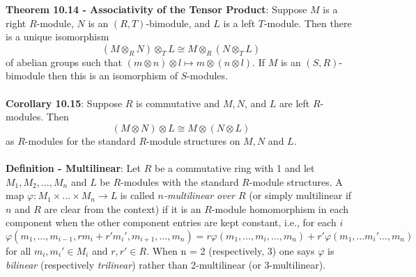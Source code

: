 \documentclass{article}
\begin{document}
\textbf{Theorem 10.14 - Associativity of the Tensor Product}: Suppose $M$ is a right $R$-module, $N$ is an $(R, T)$-bimodule, and $L$ is a left $T$-module. Then there is a unique isomorphism $$(M \otimes_R N) \otimes_T L \cong M \otimes_R (N \otimes_T L)$$ of abelian groups such that $(m \otimes n) \otimes l \mapsto m \otimes (n \otimes l)$. If $M$ is an $(S, R)$-bimodule then this is an isomorphism of $S$-modules. \\ \\
\textbf{Corollary 10.15}: Suppose $R$ is commutative and $M, N$, and $L$ are left $R$-modules. Then $$(M \otimes N) \otimes L \cong M \otimes (N \otimes L)$$ as $R$-modules for the standard $R$-module structures on $M, N$ and $L$. \\ \\
\textbf{Definition - Multilinear}: Let $R$ be a commutative ring with 1 and let $M_1, M_2, \dots, M_n$ and $L$ be
$R$-modules with the standard $R$-module structures. A map $\varphi: M_1 \times \dots \times M_n \rightarrow L$ is
called \textit{$n$-multilinear over $R$} (or simply multilinear if $n$ and $R$ are clear from the context) if it is an $R$-module homomorphism in each component when the other component entries are kept constant, i.e., for each $i$ $$\varphi(m_1, \dots, m_{i - 1}, rm_i + r'm_i', m_{i + 1}, \dots, m_n) = r\varphi(m_1, \dots, m_i, \dots, m_n) + r'\varphi(m_1, \dots m_i' \dots, m_n)$$ for all $m_i, m_i' \in M_i$ and $r, r' \in R$. When n = 2 (respectively, 3) one says $\varphi$ is \textit{bilinear} (respectively \textit{trilinear}) rather than 2-multilinear (or 3-multilinear). \\ \\
\end{document}
